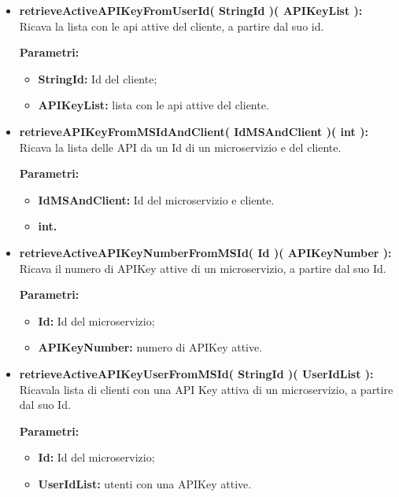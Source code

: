 \begin{itemize}
\begin{itemize}
			\item \textbf{retrieveActiveAPIKeyFromUserId( StringId )( APIKeyList ):} Ricava la lista con le api attive del cliente, a partire dal suo id.
				\begin{description}
					\item[\textbf{Parametri:}]
				\end{description}
				\begin{itemize}
					\item \textbf{StringId:} Id del cliente;
					\item \textbf{APIKeyList:} lista con le api attive del cliente.
				\end{itemize}
			
			\item \textbf{retrieveAPIKeyFromMSIdAndClient( IdMSAndClient )( int ):} Ricava la lista delle API da un Id di un microservizio e del cliente.
			\begin{description}
				\item[\textbf{Parametri:}]
			\end{description}
			\begin{itemize}
				\item \textbf{IdMSAndClient:} Id del microservizio e cliente.
				\item \textbf{int.} 
			\end{itemize}	
				
			\item \textbf{retrieveActiveAPIKeyNumberFromMSId( Id )( APIKeyNumber ):} Ricava il numero di APIKey attive di un microservizio, a partire dal suo Id.
				\begin{description}
    				\item[\textbf{Parametri:}]
				\end{description}
				\begin{itemize}
					\item \textbf{Id:} Id del microservizio;
					\item \textbf{APIKeyNumber:} numero di APIKey attive.
				\end{itemize}
			
			\item \textbf{retrieveActiveAPIKeyUserFromMSId( StringId )( UserIdList ):} Ricavala lista di clienti con una API Key attiva di un microservizio, a partire dal suo Id.
				\begin{description}
					\item[\textbf{Parametri:}]
				\end{description}
				\begin{itemize}
					\item \textbf{Id:} Id del microservizio;
					\item \textbf{UserIdList:} utenti con una APIKey attive.
				\end{itemize}
			

\end{itemize}
\end{itemize}
